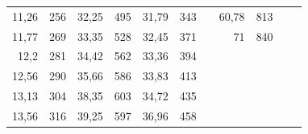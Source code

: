 \documentclass[a4paper,12pt]{article} %
\begin{document}
\begin{table}[]
\begin{tabular}{|rr|rr|rr|lrrll}
\multicolumn{1}{|r|}{11,26}         & 256                                  & \multicolumn{1}{r|}{32,25}         & 495                                  & \multicolumn{1}{r|}{31,79}         & 343                                  & \multicolumn{1}{l|}{} & \multicolumn{1}{r|}{60,78}         & \multicolumn{1}{r|}{813}             &                                    &                                      \\ \cline{1-6} \cline{8-9}
\multicolumn{1}{|r|}{11,77}         & 269                                  & \multicolumn{1}{r|}{33,35}         & 528                                  & \multicolumn{1}{r|}{32,45}         & 371                                  & \multicolumn{1}{l|}{} & \multicolumn{1}{r|}{71}            & \multicolumn{1}{r|}{840}             &                                    &                                      \\ \cline{1-6} \cline{8-9}
\multicolumn{1}{|r|}{12,2}          & 281                                  & \multicolumn{1}{r|}{34,42}         & 562                                  & \multicolumn{1}{r|}{33,36}         & 394                                  &                       & \multicolumn{1}{l}{}               & \multicolumn{1}{l}{}                 &                                    &                                      \\ \cline{1-6}
\multicolumn{1}{|r|}{12,56}         & 290                                  & \multicolumn{1}{r|}{35,66}         & 586                                  & \multicolumn{1}{r|}{33,83}         & 413                                  &                       & \multicolumn{1}{l}{}               & \multicolumn{1}{l}{}                 &                                    &                                      \\ \cline{1-6}
\multicolumn{1}{|r|}{13,13}         & 304                                  & \multicolumn{1}{r|}{38,35}         & 603                                  & \multicolumn{1}{r|}{34,72}         & 435                                  &                       & \multicolumn{1}{l}{}               & \multicolumn{1}{l}{}                 &                                    &                                      \\ \cline{1-6}
\multicolumn{1}{|r|}{13,56}         & 316                                  & \multicolumn{1}{r|}{39,25}         & 597                                  & \multicolumn{1}{r|}{36,96}         & 458                                  &                       & \multicolumn{1}{l}{}               & \multicolumn{1}{l}{}                 &                                    &                                      \\ \cline{1-6}

\end{tabular}
\end{table}
\end{document}
